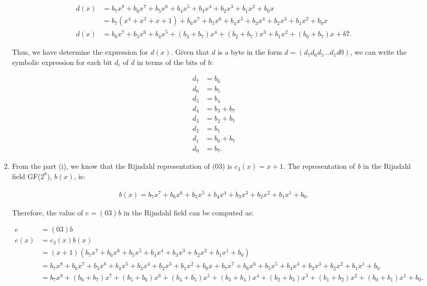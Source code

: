 \documentclass[11pt]{article}
\theoremstyle{definition}
\begin{document}
\begin{enumerate}
\begin{enumerate}
\begin{enumerate}
\begin{align*}
    d(x) &= b_7x^8 + b_6x^7 + b_5x^6 + b_4x^5 + b_3x^4 + b_2x^3 + b_1x^2 + b_0x \\
    &= b_7(x^4 + x^3 + x + 1) + b_6x^7 + b_5x^6 + b_4x^5 + b_3x^4 + b_2x^3 + b_1x^2 + b_0x \\
    d(x) &= b_6x^7 + b_5x^6 + b_4x^5 + (b_3 + b_7)x^4 + (b_2 + b_7)x^3 + b_1x^2 + (b_0 + b_7)x + b7.
\end{align*}

Thus, we have determine the expression for $d(x)$. Given that $d$ is a byte in the form $d = (d_7d_6d_5 \ldots d_1d0)$, we can write the symbolic expression for each bit $d_i$ of $d$ in terms of the bits of $b$:

\begin{align*}
    d_7 &= b_6 \\
    d_6 &= b_5 \\
    d_5 &= b_4 \\
    d_4 &= b_3 + b_7 \\
    d_3 &= b_2 + b_7 \\
    d_2 &= b_1 \\
    d_1 &= b_0 + b_7 \\
    d_0 &= b_7.
\end{align*}

\item From the part (i), we know that the Rijndahl representation of (03) is $c_3(x) = x + 1$. The representation of \textit{b} in the Rijndahl field GF($2^8$), $b(x)$, is:

\begin{align*}
    b(x) = b_7x^7 + b_6x^6 + b_5x^5 + b_4x^4 + b_3x^3 + b_2x^2 + b_1x^1 + b_0.
\end{align*}

Therefore, the value of $e = (03)b$ in the Rijndahl field can be computed as:

\begin{align*}
    e &= (03)b \\
    e(x) &= c_3(x)b(x) \\
    &= (x + 1)(b_7x^7 + b_6x^6 + b_5x^5 + b_4x^4 + b_3x^3 + b_2x^2 + b_1x^1 + b_0) \\
    &= b_7x^8 + b_6x^7 + b_5x^6 + b_4x^5 + b_3x^4 + b_2x^3 + b_1x^2 + b_0x + b_7x^7 + b_6x^6 + b_5x^5 + b_4x^4 + b_3x^3 + b_2x^2 + b_1x^1 + b_0 \\
    &= b_7x^8 + (b_6 + b_7)x^7 + (b_5 + b_6)x^6 + (b_4 + b_5)x^5 + (b_3 + b_4)x^4 + (b_2 + b_3)x^3 + (b_1 + b_2)x^2 + (b_0 + b_1)x^1 + b_0.
\end{align*}


\end{enumerate}
\end{enumerate}
\end{enumerate}
\end{document}
